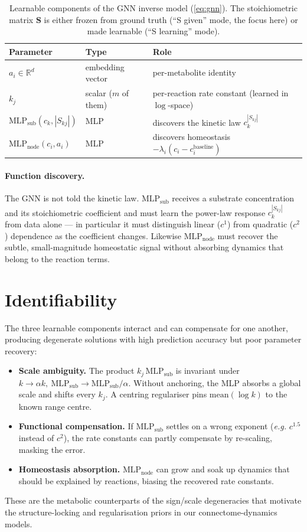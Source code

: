 \documentclass[11pt]{article}
\def\eg{{\it e.g.}}
\def\R{\mathbb{R}}
\newcommand{\mlpsub}{\mathrm{MLP}_{\mathrm{sub}}}
\newcommand{\mlpnode}{\mathrm{MLP}_{\mathrm{node}}}
\begin{document}
\begin{table}[H]
\centering
\small
\begin{tabular}{l l l}
\toprule
Parameter & Type & Role \\
\midrule
$a_i \in \R^d$ & embedding vector & per-metabolite identity \\
$k_j$ & scalar ($m$ of them) & per-reaction rate constant (learned in $\log$-space) \\
$\mlpsub(c_k, |S_{kj}|)$ & MLP & discovers the kinetic law $c_k^{|S_{kj}|}$ \\
$\mlpnode(c_i, a_i)$ & MLP & discovers homeostasis $-\lambda_i(c_i - c_i^{\mathrm{baseline}})$ \\
\bottomrule
\end{tabular}
\caption{Learnable components of the GNN inverse model
(\cref{eq:gnn}). The stoichiometric matrix $\mathbf{S}$ is either frozen
from ground truth (``S given'' mode, the focus here) or made learnable
(``S learning'' mode).}
\label{tab:params}
\end{table}

\paragraph{Function discovery.}
The GNN is not told the kinetic law. $\mlpsub$ receives a substrate
concentration and its stoichiometric coefficient and must learn the
power-law response $c_k^{|S_{kj}|}$ from data alone --- in particular it
must distinguish linear ($c^1$) from quadratic ($c^2$) dependence as the
coefficient changes. Likewise $\mlpnode$ must recover the subtle,
small-magnitude homeostatic signal without absorbing dynamics that belong
to the reaction terms.

\section{Identifiability}
\label{sec:identifiability}

The three learnable components interact and can compensate for one another,
producing degenerate solutions with high prediction accuracy but poor
parameter recovery:
\begin{itemize}
  \item \textbf{Scale ambiguity.} The product $k_j\,\mlpsub$ is invariant
    under $k \to \alpha k,\ \mlpsub \to \mlpsub/\alpha$. Without anchoring,
    the MLP absorbs a global scale and shifts every $k_j$. A centring
    regulariser pins $\mathrm{mean}(\log k)$ to the known range centre.
  \item \textbf{Functional compensation.} If $\mlpsub$ settles on a wrong
    exponent (\eg{} $c^{1.5}$ instead of $c^2$), the rate constants can
    partly compensate by re-scaling, masking the error.
  \item \textbf{Homeostasis absorption.} $\mlpnode$ can grow and soak up
    dynamics that should be explained by reactions, biasing the recovered
    rate constants.
\end{itemize}
These are the metabolic counterparts of the sign/scale degeneracies that
motivate the structure-locking and regularisation priors in our
connectome-dynamics models.
\end{document}
